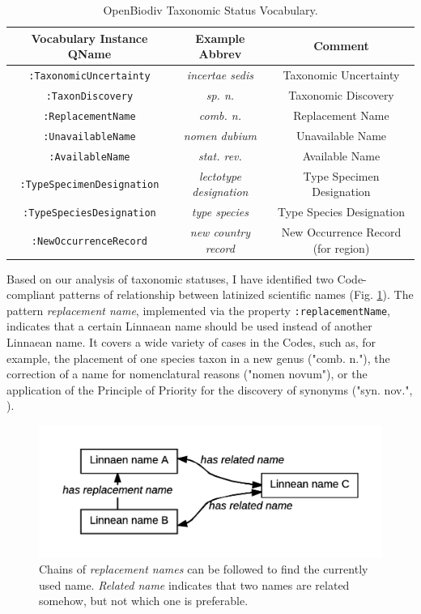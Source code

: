 \begin{table}[h!]
\caption{OpenBiodiv Taxonomic Status Vocabulary.}
\begin{tabular}{ccc}
\hline
Vocabulary Instance QName & Example Abbrev & Comment\\ \hline
{\tt :TaxonomicUncertainty} & \emph{incertae sedis} & Taxonomic Uncertainty\\
{\tt :TaxonDiscovery} & \emph{sp. n.} & Taxonomic Discovery \\
{\tt :ReplacementName} & \emph{comb. n.} & Replacement Name \\
{\tt :UnavailableName} & \emph{nomen dubium} &  Unavailable Name \\
{\tt :AvailableName} & \emph{stat. rev.} & Available Name \\
{\tt :TypeSpecimenDesignation} & \emph{lectotype designation} & Type Specimen Designation \\
{\tt :TypeSpeciesDesignation} & \emph{type species} & Type Species Designation\\
{\tt :NewOccurrenceRecord} & \emph{new country record} & New Occurrence Record (for region)\\
\hline
\end{tabular}
\label{taxonomic-status-vocabulary}
\end{table}

Based on our analysis of taxonomic statuses, I have identified two Code-compliant patterns of relationship between latinized scientific names (Fig. \ref{scientific-name-patterns}). The pattern \emph{replacement name}, implemented via the property {\tt :replacementName}, indicates that a certain Linnaean name should be used instead of another Linnaean name. It covers a wide variety of cases in the Codes, such as, for example, the placement of one species taxon in a new genus ("comb. n."), the correction of a name for nomenclatural reasons ("nomen novum"), or the application of the Principle of Priority for the discovery of synonyms ("syn. nov.", \cite{international_commission_on_zoological_nomenclature_official_2017}).

\begin{figure}[h!]
 \centering
  \includegraphics[width=\textwidth]{Figures/scientific-name-patterns}
  \decoRule
  \caption[Scientific name patterns diagram.]{
  Chains of \emph{replacement names} can be followed to find the currently used name. \emph{Related name} indicates that two names are related somehow, but not which one is preferable.}
  \label{scientific-name-patterns}
\end{figure}


